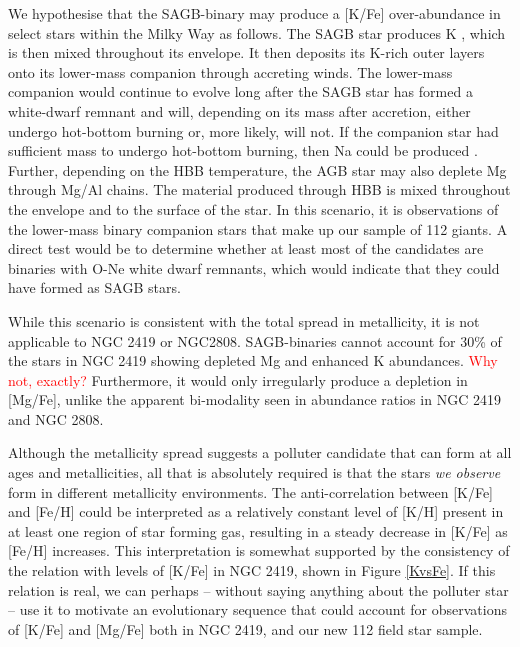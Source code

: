 \documentclass[a4paper,fleqn,usenatbib]{mnras}
\newcommand{\todo}[1]{\textcolor{red}{#1}}
\begin{document}
We hypothesise that the SAGB-binary may produce a [K/Fe] over-abundance in select stars within the Milky Way as follows. The SAGB star produces K \citep[destroying Na in the process;][]{prantzos2017}, which is then mixed throughout its envelope. It then deposits its K-rich outer layers onto its lower-mass companion through accreting winds. The lower-mass companion would continue to evolve long after the SAGB star has formed a white-dwarf remnant and will, depending on its mass after accretion, either undergo hot-bottom burning or, more likely, will not. If the companion star had sufficient mass to undergo hot-bottom burning, then Na could be produced \citep{prantzos2017}. Further, depending on the HBB temperature, the AGB star may also deplete Mg through Mg/Al chains. The material produced through HBB is mixed throughout the envelope and to the surface of the star. In this scenario, it is observations of the lower-mass binary companion stars that make up our sample of 112 giants. A direct test would be to determine whether at least most of the candidates are binaries with O-Ne white dwarf remnants, which would indicate that they could have formed as SAGB stars.

While this scenario is consistent with the total spread in metallicity, it is not applicable to NGC 2419 or NGC2808. SAGB-binaries cannot account for 30\% of the stars in NGC 2419 showing depleted Mg and enhanced K abundances. \todo{Why not, exactly?} Furthermore, it would only irregularly produce a depletion in [Mg/Fe], unlike the apparent bi-modality seen in abundance ratios in NGC 2419 and NGC 2808.

Although the metallicity spread suggests a polluter candidate that can form at all ages and metallicities, all that is absolutely required is that the stars \textit{we observe} form in different metallicity environments. The anti-correlation between [K/Fe] and [Fe/H] could be interpreted as a relatively constant level of [K/H] present in at least one region of star forming gas, resulting in a steady decrease in [K/Fe] as [Fe/H] increases. This interpretation is somewhat supported by the consistency of the relation with levels of [K/Fe] in NGC 2419, shown in Figure \ref{KvsFe}. If this relation is real, we can perhaps -- without saying anything about the polluter star -- use it to motivate an evolutionary sequence that could account for observations of [K/Fe] and [Mg/Fe] both in NGC 2419, and our new 112 field star sample.
\end{document}
